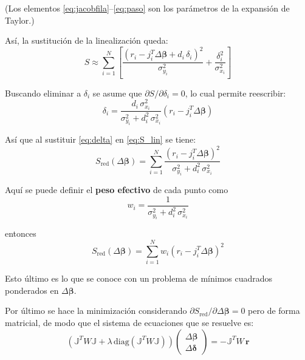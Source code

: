 (Los elementos \eqref{eq:jacobfila}–\eqref{eq:paso} son los parámetros de la expansión de Taylor.)

Así, la sustitución de la linealización queda:
\begin{equation}
    S \approx \sum_{i=1}^{N} \left[ \frac{\left(r_i - j_i^T \Delta\boldsymbol{\beta} + d_i\,\delta_i\right)^2}{\sigma_{y_i}^2} + \frac{\delta_i^2}{\sigma_{x_i}^2} \right] \label{eq:S_lin}
\end{equation}

Buscando eliminar a $\delta_i$ se asume que $\partial S / \partial \delta_i = 0$, lo cual permite reescribir:
\begin{equation}
    \delta_i = \frac{d_i\,\sigma_{x_i}^2}{\sigma_{y_i}^2 + d_i^2\,\sigma_{x_i}^2}\left(r_i - j_i^T \Delta\boldsymbol{\beta}\right) \label{eq:delta}
\end{equation}

Así que al sustituir \eqref{eq:delta} en \eqref{eq:S_lin} se tiene:
\begin{equation}
    S_{\text{red}}(\Delta\boldsymbol{\beta}) = \sum_{i=1}^{N} \frac{\left(r_i - j_i^T \Delta\boldsymbol{\beta}\right)^2}{\sigma_{y_i}^2 + d_i^2\,\sigma_{x_i}^2}
\end{equation}

Aquí se puede definir el \textbf{peso efectivo} de cada punto como
\begin{equation}
    w_i = \frac{1}{\sigma_{y_i}^2 + d_i^2\,\sigma_{x_i}^2}
\end{equation}

entonces
\begin{equation}
    S_{\text{red}}(\Delta\boldsymbol{\beta}) = \sum_{i=1}^{N} w_i\left(r_i - j_i^T \Delta\boldsymbol{\beta}\right)^2 \label{eq:Sred}
\end{equation}

Esto último es lo que se conoce con un problema de mínimos cuadrados ponderados en $\Delta\boldsymbol{\beta}$.

Por último se hace la minimización considerando $\partial S_{\text{red}} / \partial\Delta\boldsymbol{\beta} = 0$ pero de forma matricial, de modo que el sistema de ecuaciones que se resuelve es:
\begin{equation}
    \left(\mathbb{J}^T W \mathbb{J} + \lambda\,\mathrm{diag}\!\left(\mathbb{J}^T W \mathbb{J}\right)\right)
    \begin{pmatrix}\Delta\boldsymbol{\beta}\\ \Delta\boldsymbol{\delta}\end{pmatrix}
    = -\mathbb{J}^T W\,\mathbf{r} \label{eq:sistema}
\end{equation}

